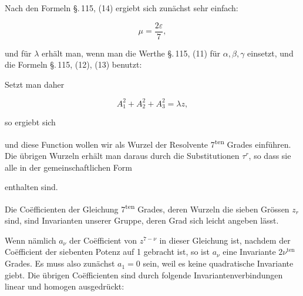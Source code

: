 
Nach den Formeln \S.\,115, (14) ergiebt sich zunächst sehr einfach:

\[
\mu = \frac{2\varepsilon}{7},
\]

und für $\lambda$ erhält man, wenn man die Werthe \S.\,115, (11) für $\alpha, \beta, \gamma$ einsetzt, und die Formeln \S.\,115, (12), (13) benutzt:


Setzt man daher

\[
A_1^2+A_2^2+A_3^2 = \lambda z,
\]

so ergiebt sich


und diese Function wollen wir als Wurzel der Resolvente 7\textsuperscript{ten} Grades einführen. Die übrigen Wurzeln erhält man daraus durch die Substitutionen $\tau^r$, so dass sie alle in der gemeinschaftlichen Form


enthalten sind.

Die Coëfficienten der Gleichung 7\textsuperscript{ten} Grades, deren Wurzeln die sieben Grössen $z_r$ sind, sind Invarianten unserer Gruppe, deren Grad sich leicht angeben l\"asst.

Wenn nämlich $a_\nu$ der Coëfficient von $z^{7-\nu}$ in dieser Gleichung ist, nachdem der Coëfficient der siebenten Potenz auf 1 gebracht ist, so ist $a_\nu$ eine Invariante $2\nu^{\text{ten}}$ Grades. Es muss also zunächst $a_1=0$ sein, weil es keine quadratische Invariante giebt. Die übrigen Coëfficienten sind durch folgende Invariantenverbindungen linear und homogen ausgedrückt:


